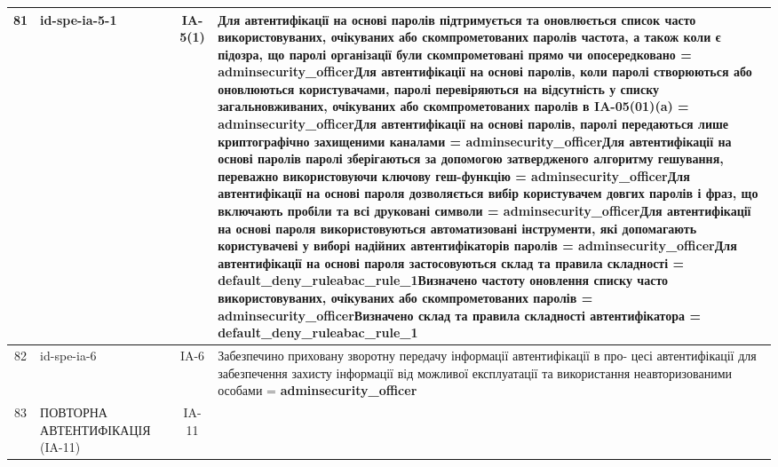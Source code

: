 \documentclass[10pt]{article}
\begin{document}
\begin{longtable}{|c|>{\raggedright\arraybackslash}p{2.5cm}|>{\raggedright\arraybackslash}p{4.5cm}|c|>{\raggedright\arraybackslash}p{4.5cm}|}
81 & id-spe-ia-5-1 &  & IA-5(1) & Для автентифікації на основі паролів підтримується та оновлюється список часто використовуваних, очікуваних або скомпрометованих паролів частота, а також коли є підозра, що паролі організації були скомпрометовані прямо чи опосередковано = \textbf{adminsecurity\_\allowbreak{}officer}\newline Для автентифікації на основі паролів, коли паролі створюються або оновлюються користувачами, паролі перевіряються на відсутність у списку загальновживаних, очікуваних або скомпрометованих паролів в IA-05(01)(a) = \textbf{adminsecurity\_\allowbreak{}officer}\newline Для автентифікації на основі паролів, паролі передаються лише криптографічно захищеними каналами = \textbf{adminsecurity\_\allowbreak{}officer}\newline Для автентифікації на основі паролів паролі зберігаються за допомогою затвердженого алгоритму гешування, переважно використовуючи ключову геш-функцію = \textbf{adminsecurity\_\allowbreak{}officer}\newline Для автентифікації на основі пароля дозволяється вибір користувачем довгих паролів і фраз, що включають пробіли та всі друковані символи = \textbf{adminsecurity\_\allowbreak{}officer}\newline Для автентифікації на основі пароля використовуються автоматизовані інструменти, які допомагають користувачеві у виборі надійних автентифікаторів паролів = \textbf{adminsecurity\_\allowbreak{}officer}\newline Для автентифікації на основі пароля застосовуються склад та правила складності = \textbf{default\_\allowbreak{}deny\_\allowbreak{}ruleabac\_\allowbreak{}rule\_\allowbreak{}1}\newline Визначено частоту оновлення списку часто використовуваних, очікуваних або скомпрометованих паролів = \textbf{adminsecurity\_\allowbreak{}officer}\newline Визначено склад та правила складності автентифікатора = \textbf{default\_\allowbreak{}deny\_\allowbreak{}ruleabac\_\allowbreak{}rule\_\allowbreak{}1} \\ \hline
82 & id-spe-ia-6 &  & IA-6 & Забезпечино приховану зворотну передачу інформації автентифікації в про- цесі автентифікації для забезпечення захисту інформації від можливої експлуатації та використання неавторизованими особами = \textbf{adminsecurity\_\allowbreak{}officer} \\ \hline
83 & ПОВТОРНА АВТЕНТИФІКАЦІЯ (IA-11) &  & IA-11 &  \\ \hline

\end{longtable}
\end{document}
